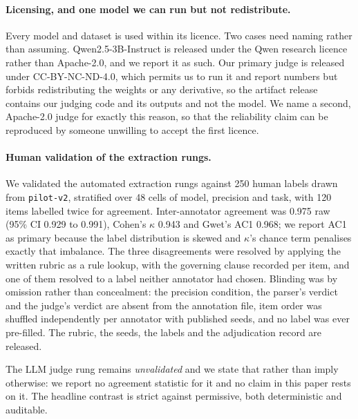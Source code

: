 \documentclass[11pt]{article}
\begin{document}
\paragraph{Licensing, and one model we can run but not redistribute.}
Every model and dataset is used within its licence. Two cases need naming
rather than assuming. Qwen2.5-3B-Instruct is released under the Qwen research
licence rather than Apache-2.0, and we report it as such. Our primary judge is
released under CC-BY-NC-ND-4.0, which permits us to run it and report numbers
but forbids redistributing the weights or any derivative, so the artifact
release contains our judging code and its outputs and not the model. We name a
second, Apache-2.0 judge for exactly this reason, so that the reliability
claim can be reproduced by someone unwilling to accept the first licence.

\paragraph{Human validation of the extraction rungs.}
We validated the automated extraction rungs against 250 human labels drawn from
\texttt{pilot-v2}, stratified over 48 cells of model, precision and task, with 120 items
labelled twice for agreement. Inter-annotator agreement was 0.975 raw (95\% CI 0.929 to
0.991), Cohen's $\kappa$ 0.943 and Gwet's AC1 0.968; we report AC1 as primary because the
label distribution is skewed and $\kappa$'s chance term penalises exactly that imbalance.
The three disagreements were resolved by applying the written rubric as a rule lookup, with
the governing clause recorded per item, and one of them resolved to a label neither
annotator had chosen. Blinding was by omission rather than concealment: the precision
condition, the parser's verdict and the judge's verdict are absent from the annotation file,
item order was shuffled independently per annotator with published seeds, and no label was
ever pre-filled. The rubric, the seeds, the labels and the adjudication record are released.

The LLM judge rung remains \emph{unvalidated} and we state that rather than imply
otherwise: we report no agreement statistic for it and no claim in this paper rests on it.
The headline contrast is strict against permissive, both deterministic and auditable.
\end{document}
